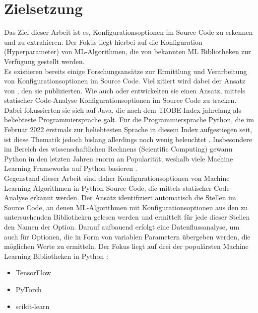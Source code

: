 \documentclass[german,bachelor]{swsLeipzig}
\begin{document}
\section{Zielsetzung}
Das Ziel dieser Arbeit ist es, Konfigurationsoptionen im Source Code zu erkennen und zu extrahieren.
Der Fokus liegt hierbei auf die Konfiguration (Hyperparameter) von ML-Algorithmen, die von bekannten ML Bibliotheken
zur Verfügung gestellt werden.\\
\indent Es existieren bereits einige Forschungsansätze zur Ermittlung und Verarbeitung von Konfigurationsoptionen im Source Code.
Viel zitiert wird dabei der Ansatz von \citeauthor{10.1145/1985793.1985812}, den sie \citeyear{10.1145/1985793.1985812} publizierten.
Wie auch \citeauthor{7774519} oder \citeauthor{8049300} entwickelten sie einen Ansatz, mittels statischer Code-Analyse Konfigurationsoptionen
im Source Code zu tracken.
Dabei fokussierten sie sich auf Java, die nach dem TIOBE-Index jahrelang als beliebteste Programmiersprache galt.
Für die Programmiersprache Python, die im Februar 2022 erstmals zur beliebtesten Sprache in diesem Index aufgestiegen seit,
ist diese Thematik jedoch bislang allerdings noch wenig beleuchtet \cite[]{enwiki:1077809155}.
Insbesondere im Bereich des wissenschaftlichen Rechnens (Scientific Computing) gewann Python in den letzten Jahren enorm an Popularität,
weshalb viele Machine Learning Frameworks auf Python basieren \cite[]{2020}.\\
\indent Gegenstand dieser Arbeit sind daher Konfigurationsoptionen von Machine Learning Algorithmen in Python Source Code, die mittels statischer Code-Analyse erkannt werden.
Der Ansatz identifiziert automatisch die Stellen im Source Code, an denen ML-Algorithmen mit Konfigurationsoptionen aus
den zu untersuchenden Bibliotheken gelesen werden und ermittelt für jede dieser Stellen den Namen der Option.
Darauf aufbauend erfolgt eine Datenflussanalyse, um auch für Optionen, die in Form von variablen Parametern übergeben werden,
die möglichen Werte zu ermitteln.
Der Fokus liegt auf drei der populärsten Machine Learning Bibliotheken in Python \cite[]{kaggle}:
\begin{itemize}
 \item TensorFlow
 \item PyTorch
 \item scikit-learn
\end{itemize}
\
\end{document}

